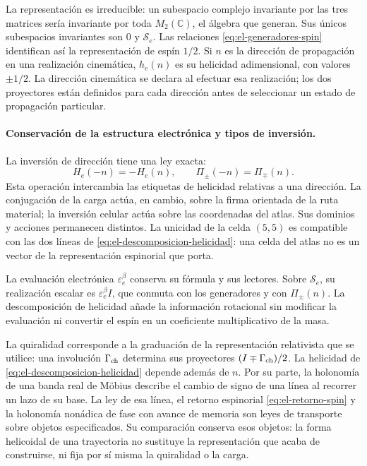 La representación es irreducible: un subespacio complejo invariante por
las tres matrices sería invariante por toda \(M_2(\mathbb C)\), el
álgebra que generan. Sus únicos subespacios invariantes son \(0\) y
\(\mathscr S_e\). Las relaciones
\eqref{eq:el-generadores-spin} identifican así la representación de
espín \(1/2\). Si \(n\) es la dirección de propagación en una
realización cinemática, \(h_e(n)\) es su helicidad adimensional, con
valores \(\pm1/2\). La dirección cinemática se declara al efectuar esa
realización; los dos proyectores están definidos para cada dirección
antes de seleccionar un estado de propagación particular.

\paragraph{Conservación de la estructura electrónica y tipos de inversión.}
La inversión de dirección tiene una ley exacta:
\[
 H_e(-n)=-H_e(n),\qquad \Pi_\pm(-n)=\Pi_\mp(n).
\]
Esta operación intercambia las etiquetas de helicidad relativas a una
dirección. La conjugación de la carga actúa, en cambio, sobre la firma
orientada de la ruta material; la inversión celular actúa sobre las
coordenadas del atlas. Sus dominios y acciones permanecen distintos.
La unicidad de la celda \((5,5)\) es compatible con las dos líneas de
\eqref{eq:el-descomposicion-helicidad}: una celda del atlas no es un
vector de la representación espinorial que porta.

La evaluación electrónica \(\varepsilon_e^\beta\) conserva su
fórmula y sus lectores. Sobre \(\mathscr S_e\), su realización escalar
es \(\varepsilon_e^\beta I\), que conmuta con los generadores y con
\(\Pi_\pm(n)\). La descomposición de helicidad añade la información
rotacional sin modificar la evaluación ni convertir el espín en un
coeficiente multiplicativo de la masa.

La quiralidad corresponde a la graduación de la representación relativista
que se utilice: una involución \(\Gamma_{\rm ch}\) determina sus
proyectores \((I\mp\Gamma_{\rm ch})/2\). La helicidad de
\eqref{eq:el-descomposicion-helicidad} depende además de \(n\).
Por su parte, la holonomía de una banda real de Möbius describe el cambio
de signo de una línea al recorrer un lazo de su base. La ley de esa línea,
el retorno espinorial \eqref{eq:el-retorno-spin} y la holonomía nonádica
de fase con avance de memoria son leyes de transporte sobre objetos
especificados. Su comparación conserva esos objetos: la forma helicoidal
de una trayectoria no sustituye la representación que acaba de
construirse, ni fija por sí misma la quiralidad o la carga.
